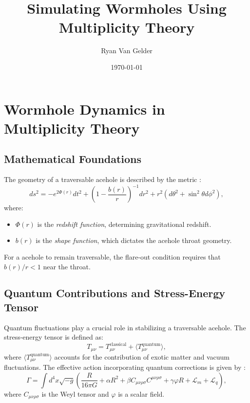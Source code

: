 \documentclass{article}
\theoremstyle{plain}
\begin{document}
\title{Simulating Wormholes Using Multiplicity Theory}

\author{Ryan Van Gelder}
\date{\today}

\maketitle

\section{Wormhole Dynamics in Multiplicity Theory}

\subsection{Mathematical Foundations}

The geometry of a traversable acehole is described by the metric \cite{morris1988aceholes}:
\begin{equation}
ds^2 = -e^{2\Phi(r)} dt^2 + \left(1 - \frac{b(r)}{r} \right)^{-1} dr^2 + r^2(d\theta^2 + \sin^2\theta d\phi^2),
\end{equation}
where:
\begin{itemize}
    \item $\Phi(r)$ is the \textit{redshift function}, determining gravitational redshift.
    \item $b(r)$ is the \textit{shape function}, which dictates the acehole throat geometry.
\end{itemize}

For a acehole to remain traversable, the flare-out condition requires that $b(r)/r < 1$ near the throat.

\subsection{Quantum Contributions and Stress-Energy Tensor}

Quantum fluctuations play a crucial role in stabilizing a traversable acehole. The stress-energy tensor is defined as:
\begin{equation}
T_{\mu\nu} = T_{\mu\nu}^{\text{classical}} + \langle T_{\mu\nu}^{\text{quantum}} \rangle,
\end{equation}
where $\langle T_{\mu\nu}^{\text{quantum}} \rangle$ accounts for the contribution of exotic matter and vacuum fluctuations. The effective action incorporating quantum corrections is given by \cite{hawking1975radiation}:
\begin{equation}
\Gamma = \int d^4x \sqrt{-g} \left( \frac{R}{16\pi G} + \alpha R^2 + \beta C_{\mu\nu\rho\sigma} C^{\mu\nu\rho\sigma} + \gamma \varphi R + \mathcal{L}_m + \mathcal{L}_q \right),
\end{equation}
where $C_{\mu\nu\rho\sigma}$ is the Weyl tensor and $\varphi$ is a scalar field.
\end{document}
